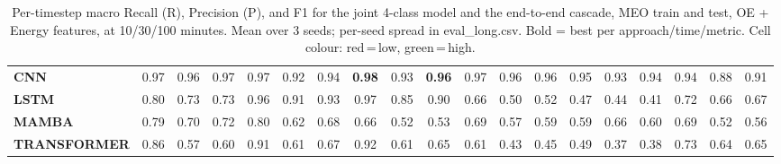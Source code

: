 \begin{table}[t]
{\begin{tabular}{l ccc ccc ccc ccc ccc ccc}
\textbf{CNN} & \cellcolor[HTML]{51CF66}0.97 & \cellcolor[HTML]{51CF66}0.96 & \cellcolor[HTML]{51CF66}0.97 & \cellcolor[HTML]{51CF66}0.97 & \cellcolor[HTML]{51CF66}0.92 & \cellcolor[HTML]{51CF66}0.94 & \cellcolor[HTML]{51CF66}\textbf{0.98} & \cellcolor[HTML]{51CF66}0.93 & \cellcolor[HTML]{51CF66}\textbf{0.96} & \cellcolor[HTML]{51CF66}0.97 & \cellcolor[HTML]{51CF66}0.96 & \cellcolor[HTML]{51CF66}0.96 & \cellcolor[HTML]{51CF66}0.95 & \cellcolor[HTML]{51CF66}0.93 & \cellcolor[HTML]{51CF66}0.94 & \cellcolor[HTML]{51CF66}0.94 & \cellcolor[HTML]{51CF66}0.88 & \cellcolor[HTML]{51CF66}0.91 \\
\textbf{LSTM} & \cellcolor[HTML]{51CF66}0.80 & \cellcolor[HTML]{5DCF63}0.73 & \cellcolor[HTML]{5CCF63}0.73 & \cellcolor[HTML]{51CF66}0.96 & \cellcolor[HTML]{51CF66}0.91 & \cellcolor[HTML]{51CF66}0.93 & \cellcolor[HTML]{51CF66}0.97 & \cellcolor[HTML]{51CF66}0.85 & \cellcolor[HTML]{51CF66}0.90 & \cellcolor[HTML]{8ED157}0.66 & \cellcolor[HTML]{FFD43B}0.50 & \cellcolor[HTML]{F3D43E}0.52 & \cellcolor[HTML]{FFC741}0.47 & \cellcolor[HTML]{FFB947}0.44 & \cellcolor[HTML]{FFAF4C}0.41 & \cellcolor[HTML]{68D060}0.72 & \cellcolor[HTML]{90D156}0.66 & \cellcolor[HTML]{88D158}0.67 \\
\textbf{MAMBA} & \cellcolor[HTML]{51CF66}0.79 & \cellcolor[HTML]{70D05E}0.70 & \cellcolor[HTML]{65D061}0.72 & \cellcolor[HTML]{51CF66}0.80 & \cellcolor[HTML]{A8D250}0.62 & \cellcolor[HTML]{84D05A}0.68 & \cellcolor[HTML]{8CD157}0.66 & \cellcolor[HTML]{F3D43E}0.52 & \cellcolor[HTML]{E8D341}0.53 & \cellcolor[HTML]{7ED05B}0.69 & \cellcolor[HTML]{CDD347}0.57 & \cellcolor[HTML]{C3D24A}0.59 & \cellcolor[HTML]{BFD24B}0.59 & \cellcolor[HTML]{92D156}0.66 & \cellcolor[HTML]{BBD24C}0.60 & \cellcolor[HTML]{78D05C}0.69 & \cellcolor[HTML]{F2D43E}0.52 & \cellcolor[HTML]{D5D345}0.56 \\
\textbf{TRANSFORMER} & \cellcolor[HTML]{51CF66}0.86 & \cellcolor[HTML]{CED347}0.57 & \cellcolor[HTML]{B9D24C}0.60 & \cellcolor[HTML]{51CF66}0.91 & \cellcolor[HTML]{B2D24E}0.61 & \cellcolor[HTML]{86D159}0.67 & \cellcolor[HTML]{51CF66}0.92 & \cellcolor[HTML]{B2D24E}0.61 & \cellcolor[HTML]{94D155}0.65 & \cellcolor[HTML]{B1D24E}0.61 & \cellcolor[HTML]{FFB549}0.43 & \cellcolor[HTML]{FFBE45}0.45 & \cellcolor[HTML]{FFD03D}0.49 & \cellcolor[HTML]{FF9C54}0.37 & \cellcolor[HTML]{FFA053}0.38 & \cellcolor[HTML]{5FCF62}0.73 & \cellcolor[HTML]{9DD153}0.64 & \cellcolor[HTML]{93D156}0.65 \\
\bottomrule
\end{tabular}%
}
\caption{Per-timestep macro Recall (R), Precision (P), and F1 for the joint 4-class model and the end-to-end cascade, MEO train and test, OE + Energy features, at 10/30/100 minutes. Mean over 3 seeds; per-seed spread in eval\_long.csv. Bold = best per approach/time/metric. Cell colour: red\,=\,low, green\,=\,high.}
\label{tab:seq_meo_phys_jc}
\end{table}
